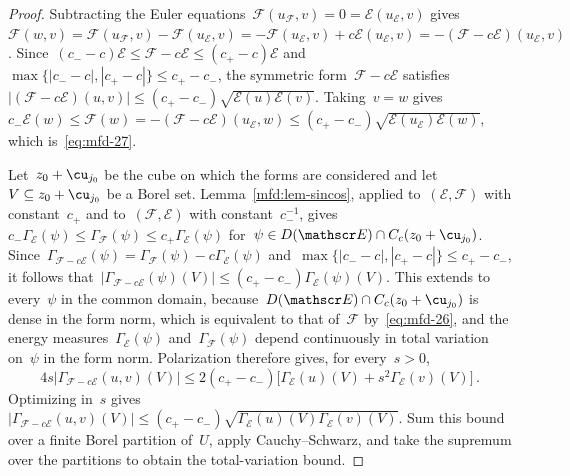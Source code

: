 \documentclass[11pt]{amsart}
\begin{document}
\begin{proof}
Subtracting the Euler equations~$\mathscr F(u_{\mathscr F},v)=0=\mathscr E(u_{\mathscr E},v)$ gives~$\mathscr F(w,v)=\mathscr F(u_{\mathscr F},v)-\mathscr F(u_{\mathscr E},v)=-\mathscr F(u_{\mathscr E},v)+c\mathscr E(u_{\mathscr E},v)=-(\mathscr F-c\mathscr E)(u_{\mathscr E},v)$. Since~$(c_--c)\mathscr E\leq \mathscr F-c\mathscr E\leq(c_+-c)\mathscr E$ and~$\max\{|c_--c|,|c_+-c|\}\leq c_+-c_-$, the symmetric form~$\mathscr F-c\mathscr E$ satisfies~$|(\mathscr F-c\mathscr E)(u,v)|\leq(c_+-c_-)\sqrt{\mathscr E(u)\mathscr E(v)}$. Taking~$v=w$ gives~$c_-\mathscr E(w)\leq \mathscr F(w)=-(\mathscr F-c\mathscr E)(u_{\mathscr E},w)\leq(c_+-c_-)\sqrt{\mathscr E(u_{\mathscr E})\mathscr E(w)}$, which is~\eqref{eq:mfd-27}.

\smallskip

Let~$z_0+\cu_{j_0}$ be the cube on which the forms are considered and let~$V\subseteq z_0+\cu_{j_0}$ be a Borel set. Lemma~\ref{mfd:lem-sincos}, applied to~$(\mathscr E,\mathscr F)$ with constant~$c_+$ and to~$(\mathscr F,\mathscr E)$ with constant~$c_-^{-1}$, gives~$c_-\Gamma_{\mathscr E}(\psi)\leq\Gamma_{\mathscr F}(\psi)\leq c_+\Gamma_{\mathscr E}(\psi)$ for~$\psi\in D(\mathscr E)\cap C_c(z_0+\cu_{j_0})$. Since~$\Gamma_{\mathscr F-c\mathscr E}(\psi)=\Gamma_{\mathscr F}(\psi)-c\Gamma_{\mathscr E}(\psi)$ and~$\max\{|c_--c|,|c_+-c|\}\leq c_+-c_-$, it follows that~$|\Gamma_{\mathscr F-c\mathscr E}(\psi)(V)|\leq(c_+-c_-)\Gamma_{\mathscr E}(\psi)(V)$. This extends to every~$\psi$ in the common domain, because~$D(\mathscr E)\cap C_c(z_0+\cu_{j_0})$ is dense in the form norm, which is equivalent to that of~$\mathscr F$ by~\eqref{eq:mfd-26}, and the energy measures~$\Gamma_{\mathscr E}(\psi)$ and~$\Gamma_{\mathscr F}(\psi)$ depend continuously in total variation on~$\psi$ in the form norm. Polarization therefore gives, for every~$s>0$,
\begin{equation*}
	4s|\Gamma_{\mathscr F-c\mathscr E}(u,v)(V)|
	\leq2(c_+-c_-)\bigl[\Gamma_{\mathscr E}(u)(V)+s^2\Gamma_{\mathscr E}(v)(V)\bigr]\,.
\end{equation*}
Optimizing in~$s$ gives~$|\Gamma_{\mathscr F-c\mathscr E}(u,v)(V)|\leq(c_+-c_-)\sqrt{\Gamma_{\mathscr E}(u)(V)\Gamma_{\mathscr E}(v)(V)}$. Sum this bound over a finite Borel partition of~$U$, apply Cauchy--Schwarz, and take the supremum over the partitions to obtain the total-variation bound.
\end{proof}
\end{document}
